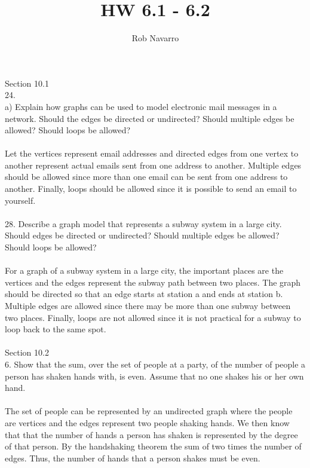 \documentclass[11pt, oneside]{article}   	%
\title{HW 6.1 - 6.2}
\author{Rob Navarro}
\begin{document}
\maketitle

\noindent
Section 10.1\\
24.\\
a) Explain how graphs can be used to model electronic mail messages in a network. Should the edges be directed or undirected? Should multiple edges be allowed? Should loops be allowed?\\\\
Let the vertices represent email addresses and directed edges from one vertex to another represent actual emails sent from one address to another. Multiple edges should be allowed since more than one email can be sent from one address to another. Finally, loops should be allowed since it is possible to send an email to yourself. \\\\
28. Describe a graph model that represents a subway system in a large city. Should edges be directed or undirected? Should multiple edges be allowed? Should loops be allowed?\\\\
For a graph of a subway system in a large city, the important places are the vertices and the edges represent the subway path between two places. The graph should be directed so that an edge starts at station a and ends at station b. Multiple edges are allowed since there may be more than one subway between two places. Finally, loops are not allowed since it is not practical for a subway to loop back to the same spot.\\\\
Section 10.2\\
6. Show that the sum, over the set of people at a party, of the number of people a person has shaken hands with, is even. Assume that no one shakes his or her own hand.\\\\
The set of people can be represented by an undirected graph where the people are vertices and the edges represent two people shaking hands. We then know that that the number of hands a person has shaken is represented by the degree of that person. By the handshaking theorem the sum of two times the number of edges. Thus, the number of hands that a person shakes must be even.\\\\
\end{document}
